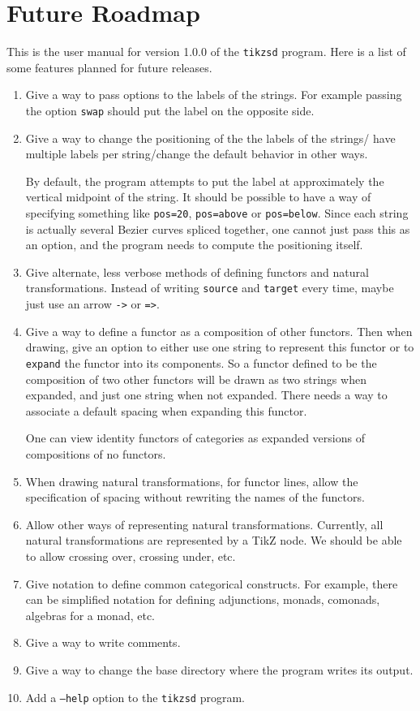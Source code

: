 \documentclass{amsart}
\begin{document}
\section{Future Roadmap}
This is the user manual for version 1.0.0 of the \texttt{tikzsd} program.
Here is a list of some features planned for future releases.
\begin{enumerate}
\item Give a way to pass options to the labels of the strings.
    For example passing the option \texttt{swap} should put the label on the opposite side.
\item Give a way to change the positioning of the  the labels of the strings/
        have multiple labels per string/change the default behavior in other ways.

    By default, the program attempts to put the label at approximately the vertical midpoint
        of the string.
    It should be possible to have a way of specifying something like \texttt{pos=20},
        \texttt{pos=above} or \texttt{pos=below}.
    Since each string is actually several Bezier curves spliced together,
        one cannot just pass this as an option, and the program needs to compute the positioning
        itself.
\item Give alternate, less verbose methods of defining functors and natural transformations.
    Instead of writing \texttt{source} and \texttt{target} every time, maybe just 
        use an arrow \texttt{->} or \texttt{=>}.
\item Give a way to define a functor as a composition of other functors.
    Then when drawing, give an option to either use one string to represent this functor
        or to \texttt{expand} the functor into its components.
    So a functor defined to be the composition of two other functors will be drawn
        as two strings when expanded, and just one string when not expanded.
    There needs a way to associate a default spacing when expanding this functor.

    One can view identity functors of categories as expanded versions of compositions
        of no functors.
\item When drawing natural transformations, for functor lines, allow the specification
        of spacing without rewriting the names of the functors.
\item Allow other ways of representing natural transformations.
    Currently, all natural transformations are represented by a TikZ node.
    We should be able to allow crossing over, crossing under, etc.
\item Give notation to define common categorical constructs.
    For example, there can be simplified notation for defining adjunctions,
        monads, comonads, algebras for a monad, etc.
\item Give a way to write comments.
\item Give a way to change the base directory where the program writes its output.
\item Add a \texttt{--help} option to the \texttt{tikzsd} program.
\end{enumerate}
\end{document}
